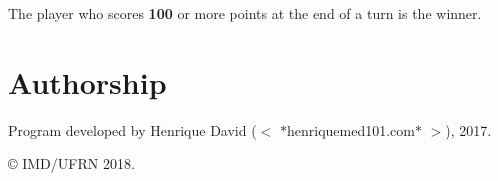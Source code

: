 The player who scores {\bfseries 100} or more points at the end of a turn is the winner.

\section*{Authorship}

Program developed by Henrique David ($<$ $\ast$henriquemed101.com$\ast$ $>$), 2017.

\copyright{} I\+M\+D/\+U\+F\+RN 2018. 